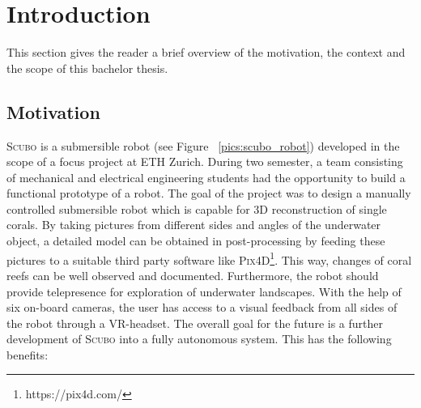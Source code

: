 \nocite{*}
\chapter{Introduction}
\label{sec:introduction}

This section gives the reader a brief overview of the motivation, the context and the scope of this bachelor thesis.

\section{Motivation}

\textsc{Scubo} is a submersible robot (see Figure ~\ref{pics:scubo_robot}) developed in the scope of a focus project at ETH Zurich. During two semester, a team consisting of mechanical and electrical engineering students had the opportunity to build a functional prototype of a robot. The goal of the project was to design a manually controlled submersible robot which is capable for 3D reconstruction of single corals. By taking pictures from different sides and angles of the underwater object, a detailed model can be obtained in post-processing by feeding these pictures to a suitable third party software like \textsc{Pix4D}\footnote{https://pix4d.com/}. This way, changes of coral reefs can be well observed and documented. Furthermore, the robot should provide telepresence for exploration of underwater landscapes. With the help of six on-board cameras, the user has access to a visual feedback from all sides of the robot through a VR-headset. The overall goal for the future is a further development of \textsc{Scubo} into a fully autonomous system. This has the following benefits:  

